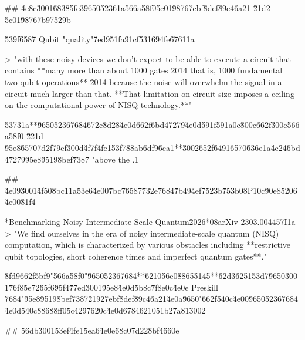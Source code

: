 \documentclass[10pt]{article}
\begin{document}
\begin{AnswerText}
## \u4e8c\u3001\u6838\u5fc3\u9650\u5236\uff1a\u566a\u58f0\u5c01\u9876\u7ebf\u8def\u89c4\u6a21 \u21d2 \u5c01\u9876\u7b97\u529b

\u539f\u6587 Qubit "quality"\u7ed9\u51fa\u91cf\u5316\u94fe\u6761\uff1a

> "with these noisy devices we don't expect to be able to execute a circuit that contains **many more than about 1000 gates \u2014 that is, 1000 fundamental two-qubit operations** \u2014 because the noise will overwhelm the signal in a circuit much larger than that. **That limitation on circuit size imposes a ceiling on the computational power of NISQ technology.**"

\u5373\uff1a**\u9650\u5236\u7684\u672c\u8d28\u4e0d\u662f\u6bd4\u7279\u4e0d\u591f\u591a\uff0c\u800c\u662f\u300c\u566a\u58f0 \u221d \u95e8\u6570\u7d2f\u79ef\u300d\u4f7f\u4fe1\u53f7\u88ab\u6df9\u6ca1**\u3002\u652f\u6491\u6570\u636e\uff1a\u4e24\u6bd4\u7279\u95e8\u9519\u8bef\u7387 "above the .1%

## \u4e09\u3001\u4f50\u8bc1\uff1a\u53e6\u4e00\u7bc7\u6587\u732e\u7684\u7b49\u4ef7\u523b\u753b\uff08P1\uff0c\u90e8\u5206\u4e00\u81f4

*Benchmarking Noisy Intermediate-Scale Quantum\u2026*\uff08arXiv 2303.00445\xa7I\uff1a
> "We find ourselves in the era of noisy intermediate-scale quantum (NISQ) computation, which is characterized by various obstacles including **restrictive qubit topologies, short coherence times and imperfect quantum gates**."

\u8fd9\u662f\u5bf9"\u566a\u58f0"\u9650\u5236\u7684**\u6210\u56e0\u8865\u5145**\u62d3\u6251\u53d7\u9650\u3001\u76f8\u5e72\u65f6\u95f4\u77ed\u3001\u95e8\u4e0d\u5b8c\u7f8e\uff0c\u4e0e Preskill \u7684"\u95e8\u9519\u8bef\u7387\u2192\u7ebf\u8def\u89c4\u6a21\u4e0a\u9650"\u662f\u540c\u4e00\u9650\u5236\u7684\u4e0d\u540c\u8868\u8ff0\u5c42\u9762\uff0c\u4e0d\u6784\u6210\u51b2\u7a81\u3002

## \u56db\u3001\u53ef\u4fe1\u5ea6\u4e0e\u68c0\u7d22\u8bf4\u660e


\end{AnswerText}
\end{document}

